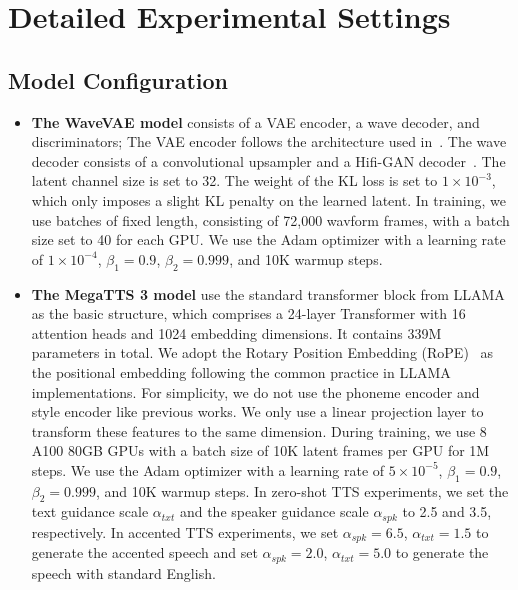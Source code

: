 \appendix

\section{Detailed Experimental Settings}

\subsection{Model Configuration}
\label{app:model_config}

\begin{itemize}
\item \textbf{The WaveVAE model} consists of a VAE encoder, a wave decoder, and discriminators; The VAE encoder follows the architecture used in~\citep{ji2024wavtokenizer}. The wave decoder consists of a convolutional upsampler and a Hifi-GAN decoder~\citep{kong2020hifi}. The latent channel size is set to 32. The weight of the KL loss is set to $1\times10^{-3}$, which only imposes a slight KL penalty on the learned latent. In training, we use batches of fixed length, consisting of 72,000 wavform frames, with a batch size set to 40 for each GPU. We use the Adam optimizer with a learning rate of $1\times10^{-4}$, $\beta_{1} = 0.9$, $\beta_{2} = 0.999$, and 10K warmup steps.

\item \textbf{The MegaTTS 3 model} use the standard transformer block from LLAMA~\citep{dubey2024llama} as the basic structure, which comprises a 24-layer Transformer with 16 attention heads and 1024 embedding dimensions. It contains 339M parameters in total. We adopt the Rotary Position Embedding (RoPE)~\citep{su2024roformer} as the positional embedding following the common practice in LLAMA implementations. For simplicity, we do not use the phoneme encoder and style encoder like previous works. We only use a linear projection layer to transform these features to the same dimension. During training, we use 8 A100 80GB GPUs with a batch size of 10K latent frames per GPU for 1M steps. We use the Adam optimizer with a learning rate of $5\times10^{-5}$, $\beta_{1} = 0.9$, $\beta_{2} = 0.999$, and 10K warmup steps. In zero-shot TTS experiments, we set the text guidance scale $\alpha_{txt}$ and the speaker guidance scale $\alpha_{spk}$ to 2.5 and 3.5, respectively. In accented TTS experiments, we set $\alpha_{spk}=6.5$, $\alpha_{txt}=1.5$ to generate the accented speech and set $\alpha_{spk}=2.0$, $\alpha_{txt}=5.0$ to generate the speech with standard English.

\end{itemize}



